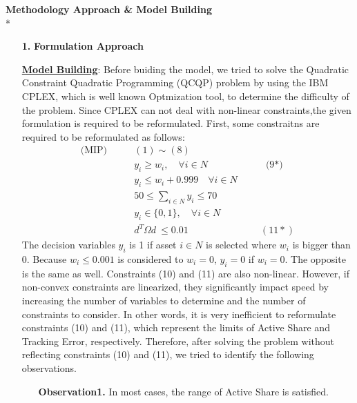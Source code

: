 \documentclass[11pt]{article}
\begin{document}
\textbf{Methodology Approach {\&} Model Building}\\*
\begin{itemize}

\item[\textbf{1.}] \textbf{Formulation Approach}
	\item[] \underline{\textbf{Model Building}}:
	Before buiding the model, we tried to solve the  Quadratic Constraint Quadratic Programming (QCQP)  problem by using the IBM CPLEX, which is well known Optmization tool, to determine the difficulty of the problem. Since CPLEX can not deal with non-linear constraints,the given formulation is required to be reformulated. 
	First, some constraitns are required to be reformulated as follows:
	\begin{align*}
	\text{(MIP)} \quad \quad &(1) \sim (8) \\
    & y_i \geq w_i, \quad \forall i \in N    \quad \quad \quad  \quad  \quad  \quad\text{(9*)}\\
	& y_i \leq w_i + 0.999 \quad \forall i \in N \\
	& 50 \leq \sum_{i \in N} y_i \leq 70 \\
	& y_i \in \{0,1\}, \quad \forall i \in N \\
	&  d^T\Omega  d \  \leq 0.01  \quad  \quad  \quad  \quad \quad \ \ \quad \quad(11*)
	\end{align*} 
	The decision variables $y_i$ is 1 if asset $i \in N$ is selected where $w_i$ is bigger than 0. Because $w_i \leq 0.001$ is considered to $w_i = 0$,  $y_i = 0$ if $w_i = 0$. The opposite is the same as well. Constraints (10) and (11) are also non-linear. However, if non-convex constraints are linearized, they significantly impact speed by increasing the number of variables to determine and the number of constraints to consider. In other words, it is very inefficient to reformulate constraints (10) and (11), which represent the limits of Active Share and Tracking Error, respectively. Therefore, after solving the problem without reflecting constraints (10) and (11), we tried to identify the following observations.
	\begin{itemize}
		\item[] \textbf{Observation1.} In most cases, the range of Active Share is satisfied.

\end{itemize}
\end{itemize}
\end{document}
